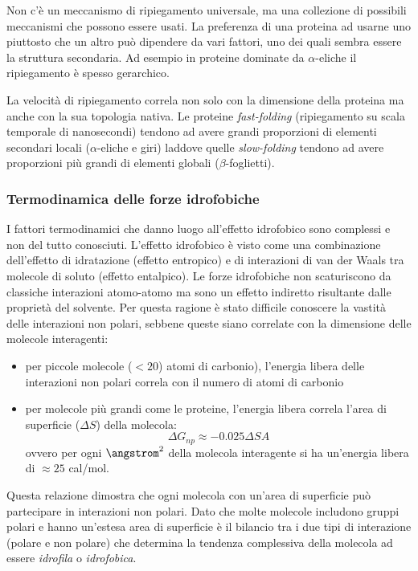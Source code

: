 {{Non c'è un meccanismo di ripiegamento universale, ma una collezione di possibili meccanismi che possono essere usati. La preferenza di una proteina ad usarne uno piuttosto che un altro può dipendere da vari fattori, uno dei quali sembra essere la struttura secondaria. Ad esempio in proteine dominate da $\alpha$-eliche il ripiegamento è spesso gerarchico. 

\par La velocità di ripiegamento correla non solo con la dimensione della proteina ma anche con la sua topologia nativa. Le proteine \textit{fast-folding} (ripiegamento su scala temporale di nanosecondi) tendono ad avere grandi proporzioni di elementi secondari locali ($\alpha$-eliche e giri) laddove quelle \textit{slow-folding} tendono ad avere proporzioni più grandi di elementi globali ($\beta$-foglietti).

\subsubsection{Termodinamica delle forze idrofobiche} \label{sec:termodinamica-forze-idrofobiche}

\par I fattori termodinamici che danno luogo all’effetto idrofobico sono complessi e non del tutto conosciuti. L’effetto idrofobico è visto come una combinazione dell’effetto di idratazione (effetto entropico) e di interazioni di van der Waals tra molecole di soluto (effetto entalpico). Le forze idrofobiche non scaturiscono da classiche interazioni atomo-atomo ma sono un effetto indiretto risultante dalle proprietà del solvente. Per questa ragione è stato difficile conoscere la vastità delle interazioni non polari, sebbene queste siano correlate con la dimensione delle molecole interagenti\supercite{kessel_ben-tal_2018}:
\begin{itemize}
	\item per piccole molecole ($<20$) atomi di carbonio), l'energia libera delle interazioni non polari correla con il numero di atomi di carbonio 
	\item per molecole più grandi come le proteine, l'energia libera correla l'area di superficie ($\Delta S$) della molecola:
	\[ \Delta G_{np} \approx -0.025\Delta SA \]
	ovvero per ogni $\angstrom^{2}$ della molecola interagente si ha un'energia libera di $\approx 25$ cal/mol.
\end{itemize}}

Questa relazione dimostra che ogni molecola con un'area di superficie può partecipare in interazioni non polari. Dato che molte molecole includono gruppi polari e hanno un'estesa area di superficie è il bilancio tra i due tipi di interazione (polare e non polare) che determina la tendenza complessiva della molecola ad essere \textit{idrofila} o \textit{idrofobica}.

}
	
